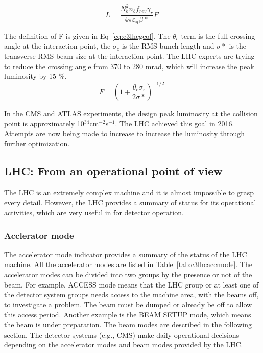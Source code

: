 \begin{equation}
 L = \frac{N^{2}_{b}n_{b}f_{rev}\gamma_{r}}{4\pi \varepsilon_{n}\beta *}F \;
 \label{eq:c3lhclumi}
\end{equation}

The definition of F is given in Eq~\ref{eq:c3lhcgeof}. The $\theta_{c}$ term is the full crossing angle at the interaction point, the $\sigma_{z}$ is the RMS bunch length and $\sigma *$ is the transverse RMS beam size at the interaction point. The LHC experts are trying to reduce the crossing angle from 370 to 280 mrad, which will increase the peak luminosity by 15 \%. 
\begin{equation}
 F = (1+\frac{\theta_{c}\sigma_{z}}{2\sigma *})^{-1/2} \;
 \label{eq:c3lhcgeof}
\end{equation}

In the CMS and ATLAS experiments, the design peak luminosity at the collision point is approximately 10$^{34}$cm$^{-2}$s$^{-1}$. The LHC achieved this goal in 2016. Attempts are now being made to increase to increase the luminosity through further optimization.

\clearpage
\subsection{LHC: From an operational point of view}

The LHC is an extremely complex machine and it is almost impossible to grasp every detail. However, the LHC provides a summary of status for its operational activities, which are very useful in for detector operation.

\subsubsection{Acclerator mode}

The accelerator mode indicator provides a summary of the status of the LHC machine. All the accelerator modes are listed in Table~\ref{tab:c3lhcaccmode}. The accelerator modes can be divided into two groups by the presence or not of the beam. For example, ACCESS mode means that the LHC group or at least one of the detector system groups needs access to the machine area, with the beams off, to investigate a problem. The beam must be dumped or already be off to allow this access period. Another example is the BEAM SETUP mode, which means the beam is under preparation. The beam modes are described in the following section. The detector systems (e.g., CMS) make daily operational decisions depending on the accelerator modes and beam modes provided by the LHC.

